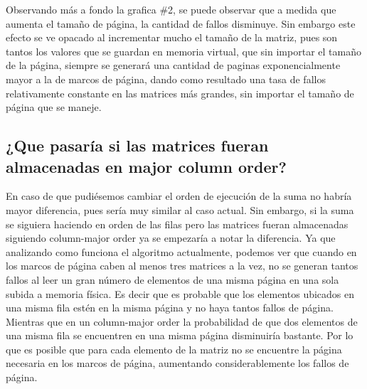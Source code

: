 \documentclass[a4paper]{article}
\begin{document}
Observando más a fondo la grafica \#2, se puede observar que a medida que aumenta el tamaño de página, la cantidad de fallos disminuye. Sin embargo este efecto se ve opacado al incrementar mucho el tamaño de la matriz, pues son tantos los valores que se guardan en memoria virtual, que sin importar el tamaño de la página, siempre se generará una cantidad de paginas exponencialmente mayor a la de marcos de página, dando como resultado una tasa de fallos relativamente constante en las matrices más grandes, sin importar el tamaño de página que se maneje.


\subsection{¿Que pasaría si las matrices fueran almacenadas en major column order?}
En caso de que pudiésemos cambiar el orden de ejecución de la suma no habría mayor diferencia, pues sería muy similar al caso actual. Sin embargo, si la suma se siguiera haciendo en orden de las filas pero las matrices fueran almacenadas siguiendo column-major order ya se empezaría a notar la diferencia. Ya que analizando como funciona el algoritmo actualmente, podemos ver que cuando en los marcos de página caben al menos tres matrices a la vez, no se generan tantos fallos al leer un gran número de elementos de una misma página en una sola subida a memoria física. Es decir que es probable que los elementos ubicados en una misma fila estén en la misma página y no haya tantos fallos de página. Mientras que en un column-major order la probabilidad de que dos elementos de una misma fila se encuentren en una misma página disminuiría bastante. Por lo que es posible que para cada elemento de la matriz no se encuentre la página necesaria en los marcos de página, aumentando considerablemente los fallos de página.
\end{document}
